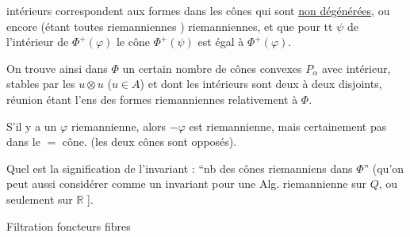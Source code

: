 intérieurs correspondent aux formes dans les
cônes qui sont \uline{non dégénérées}, ou encore
(étant toutes riemanniennes ) riemanniennes,
et que pour tt $\psi$ de l'intérieur de
$\Phi^+(\varphi)$ le cône $\Phi^+(\psi)$ est égal à $\Phi^+(\varphi)$.

On trouve ainsi dans $\Phi$ un certain
nombre de cônes convexes  $P_\alpha$ avec
intérieur, stables par les $u\otimes u$ ($u\in A$)
et dont les intérieurs sont deux à
deux disjoints,   réunion  étant l'ens
des formes riemanniennes relativement à $\Phi$.

S'il y a un $\varphi$ riemannienne, alors $-\varphi$ est
riemannienne, mais certainement pas dans le
$=$ cône. (les deux cônes sont opposés).

Quel est la signification de l'invariant :
``nb des cônes riemanniens dans $\Phi$''
(qu'on peut aussi considérer comme
un invariant pour une Alg. riemannienne
sur $Q$, ou seulement sur $\mathbb R$ \unsure{---|-,-}].

Filtration  foncteurs fibres
